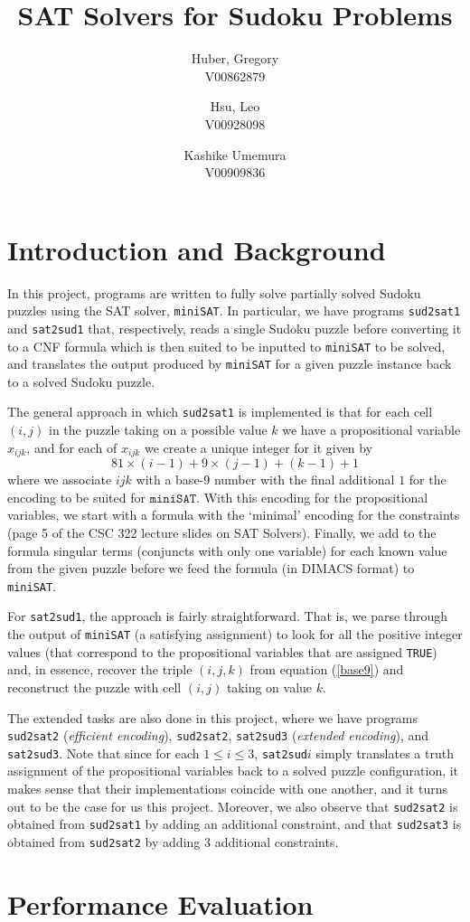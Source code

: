 \documentclass[12pt]{article}
\title{SAT Solvers for Sudoku Problems}
\author{
  Huber, Gregory \\
  V00862879
  \and
  Hsu, Leo \\
  V00928098
  \and
  Kashike Umemura \\
  V00909836
}
\begin{document}
\maketitle

\section{Introduction and Background}

\indent In this project, programs are written to fully solve partially solved Sudoku puzzles using the SAT solver, \texttt{miniSAT}. In particular, we have programs \texttt{sud2sat1} and \texttt{sat2sud1} that, respectively, reads a single Sudoku puzzle before converting it to a CNF formula which is then suited to be inputted to \texttt{miniSAT} to be solved, and translates the output produced by \texttt{miniSAT} for a given puzzle instance back to a solved Sudoku puzzle.
\newline

The general approach in which \texttt{sud2sat1} is implemented is that for each cell $(i, j)$ in the puzzle taking on a possible value $k$ we have a propositional variable $x_{ijk}$, and for each of $x_{ijk}$ we create a unique integer for it given by
\begin{equation}\label{base9}
81 \times (i-1) + 9 \times (j-1) + (k-1) + 1
\end{equation}
where we associate $ijk$ with a base-9 number with the final additional $1$ for the encoding to be suited for $\texttt{miniSAT}$. With this encoding for the propositional variables, we start with a formula with the `minimal' encoding for the constraints (page 5 of the CSC 322 lecture slides on SAT Solvers). Finally, we add to the formula singular terms (conjuncts with only one variable) for each known value from the given puzzle before we feed the formula (in DIMACS format) to \texttt{miniSAT}.
\newline

For \texttt{sat2sud1}, the approach is fairly straightforward. That is, we parse through the output of \texttt{miniSAT} (a satisfying assignment) to look for all the positive integer values (that correspond to the propositional variables that are assigned \texttt{TRUE}) and, in essence, recover the triple $(i, j, k)$ from equation (\ref{base9}) and reconstruct the puzzle with cell $(i, j)$ taking on value $k$.
\newline

The extended tasks are also done in this project, where we have programs \texttt{sud2sat2} (\emph{efficient encoding}), \texttt{sud2sat2}, \texttt{sat2sud3} (\emph{extended encoding}), and \texttt{sat2sud3}. Note that since for each $1 \leq i \leq 3$, \texttt{sat2sud}$i$ simply translates a truth assignment of the propositional variables back to a solved puzzle configuration, it makes sense that their implementations coincide with one another, and it turns out to be the case for us this project. Moreover, we also observe that \texttt{sud2sat2} is obtained from \texttt{sud2sat1} by adding an additional constraint, and that \texttt{sud2sat3} is obtained from \texttt{sud2sat2} by adding 3 additional constraints.

\section{Performance Evaluation}
\end{document}
